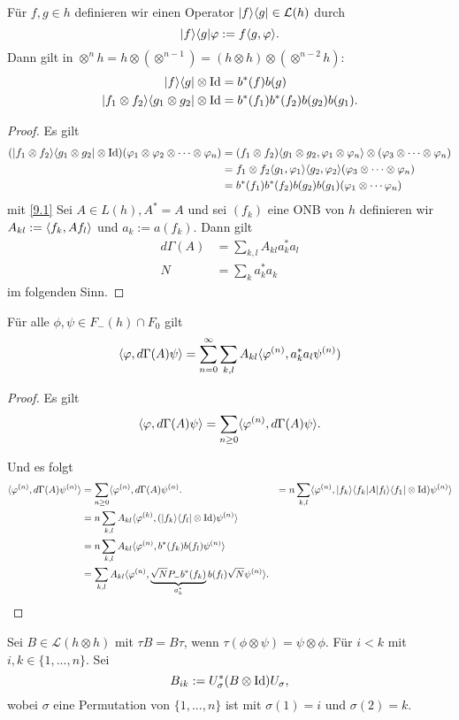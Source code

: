 \documentclass{mycourse}
\begin{document}
Für $f,g \in h$ definieren wir einen Operator $| f \rangle \langle g| \in \mathcal L(h)$ durch
\[
|f\rangle \langle g| \varphi := f\langle g, \varphi \rangle.
\]
Dann gilt in $\otimes^n h= h \otimes (\otimes^{n-1})=(h\otimes h) \otimes (\otimes^{n-2}h)$:
\begin{equation}\label{9.1}
\begin{aligned}
  |f\rangle \langle g| \otimes \operatorname{Id} &= b^*(f) b(g)\\
  |f_1 \otimes f_2 \rangle \langle g_1 \otimes g_2| \otimes \operatorname{Id} &= b^*(f_1) b^*(f_2) b(g_2) b(g_1).
\end{aligned}
\end{equation}
\begin{proof}
Es gilt
\begin{align*}
( |f_1 \otimes f_2\rangle \langle g_1 \otimes g_2 | \otimes \operatorname{Id}) (\varphi_1 \otimes \varphi_2 \otimes \cdots \otimes \varphi_n)&= (f_1 \otimes f_2) \langle g_1 \otimes g_2, \varphi_1 \otimes \varphi_n\rangle \otimes(\varphi_3 \otimes \cdots \otimes \varphi_n)\\
&= f_1 \otimes f_2 \langle g_1, \varphi_1\rangle \langle g_2, \varphi_2\rangle (\varphi_3 \otimes \cdots \otimes \varphi_n)\\
&= b^*(f_1) b^*(f_2) b(g_2) b(g_1) (\varphi_1 \otimes \cdots  \varphi_n)
\end{align*}
\fixme mit \eqref{9.1} 
Sei $A\in L(h), A^*=A$ und sei $(f_k)$ eine ONB von $h$ definieren wir $A_{kl} := \langle f_k, A f_l\rangle$ und $a_k := a(f_k)$. Dann gilt
\begin{align*}
d\Gamma(A) &= \sum_{k,l} A_{kl} a_k^* a_l\\
N &= \sum_k a_k^* a_k
\end{align*}
im folgenden Sinn.
\end{proof}
\begin{st}
Für alle $\phi, \psi\in F_-(h) \cap F_0$ gilt
\[
\langle \varphi, d\Gamma(A) \psi \rangle = \sum_{n=0}^\infty \sum_{k,l} A_{kl} \langle \varphi^{(n)}, a_k^* a_l \psi^{(n)})
\]
\end{st}
\begin{proof}
Es gilt
\[
\langle \varphi, d\Gamma(A) \psi\rangle = \sum_{n\ge 0} \langle \varphi^{(n)}, d\Gamma(A) \psi\rangle.
\]

Und es folgt
\begin{align*}
\langle \varphi^{(n)}, d\Gamma(A) \psi^{(n)}\rangle &= \sum_{n\ge 0} \langle \varphi^{(n)}, d\Gamma(A) \psi^{(n)}.
&= n \sum_{k,l} \langle \varphi^{(n)} , |f_k \rangle \langle f_k | A|f_l\rangle \langle f_1 | \otimes \operatorname{Id}) \psi^{(n)}\rangle\\
&= n \sum_{k,l} A_{kl} \langle \varphi^{(k)}, ( |f_k \rangle \langle f_l| \otimes \operatorname{Id}) \psi^{(n)}\rangle \\
&= n \sum_{k,l} A_{kl} \langle\varphi^{(n)},b^*(f_k) b(f_l) \psi^{(n)}\rangle \\
&= \sum_{k,l} A_{kl}\langle \varphi^{(n)}, \underbrace{\sqrt{N} P_- b^*(f_k)}_{a_k^*}  b(f_l) \sqrt{N} \psi^{(n)}\rangle.
\end{align*}
\end{proof}
Sei $B\in \mathcal L(h\otimes h)$ mit $\tau B = B \tau$, wenn $\tau(\phi \otimes \psi) = \psi \otimes \phi$. Für $i<k$ mit $i,k\in \{1,...,n\}$. Sei
\[
B_{ik} := U_\sigma^*(B\otimes \operatorname{Id}) U_\sigma,
\] 
wobei $\sigma$ eine Permutation von $\{1,..., n\}$ ist mit $\sigma(1) =i$ und $\sigma(2)=k$.
\end{document}
